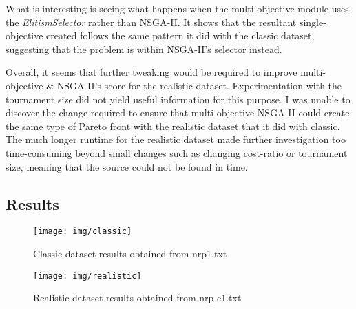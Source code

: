 \documentclass[11pt, a4paper]{article}
\begin{document}
What is interesting is seeing what happens when the multi-objective module uses
the \emph{ElitismSelector} rather than NSGA-II. It shows that the resultant
single-objective created follows the same pattern it did with the classic
dataset, suggesting that the problem is within NSGA-II's selector instead.

Overall, it seems that further tweaking would be required to improve
multi-objective \& NSGA-II's score for the realistic dataset. Experimentation
with the tournament size did not yield useful information for this purpose. I
was unable to discover the change required to ensure that multi-objective
NSGA-II could create the same type of Pareto front with the realistic dataset
that it did with classic. The much longer runtime for the realistic dataset made
further investigation too time-consuming beyond small changes such as changing
cost-ratio or tournament size, meaning that the source could not be found in
time.

\newpage
\subsection{Results} %
\label{sub:results}
\begin{figure}[H]
    \centering
    \texttt{[image: img/classic]}
    \caption{Classic dataset results obtained from nrp1.txt}
    \label{fig:classic}
\end{figure}

\begin{figure}[H]
    \centering
    \texttt{[image: img/realistic]}
    \caption{Realistic dataset results obtained from nrp-e1.txt}
    \label{fig:realistic}
\end{figure}

% 
%  
\end{document}

